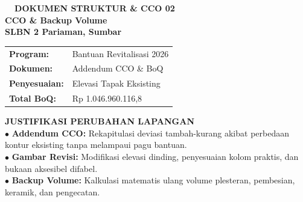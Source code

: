 \documentclass[10pt,a4paper,landscape]{article}
\begin{document}
\noindent
\begin{minipage}[t]{0.30\linewidth}
  \vspace{0pt}
  \begin{tcolorbox}[sharp corners, boxrule=0.8pt, colframe=pborder, colback=white, left=3mm, right=3mm, top=2.5mm, bottom=2.5mm, height=98mm]
    \colorbox{pred}{\fontsize{7pt}{8pt}\selectfont\bfseries\color{white}\ \ DOKUMEN STRUKTUR \& CCO 02\ \ }\\[1.5mm]
    {\fontsize{9.5pt}{11.5pt}\selectfont\bfseries\color{pnavy}CCO \& Backup Volume}\\[0.5mm]
    {\fontsize{7pt}{8.5pt}\selectfont\bfseries\color{pred}SLBN 2 Pariaman, Sumbar}\\[2mm]

    \begin{tcolorbox}[sharp corners, boxrule=0.5pt, colframe=pborder, colback=pbglight, left=2mm, right=2mm, top=1.5mm, bottom=1.5mm]
      \begin{tabularx}{\linewidth}{@{}p{22mm} X@{}}
        {\fontsize{6.8pt}{8pt}\selectfont\bfseries Program:} & {\fontsize{6.8pt}{8pt}\selectfont Bantuan Revitalisasi 2026} \\[0.8mm]
        {\fontsize{6.8pt}{8pt}\selectfont\bfseries Dokumen:} & {\fontsize{6.8pt}{8pt}\selectfont Addendum CCO \& BoQ} \\[0.8mm]
        {\fontsize{6.8pt}{8pt}\selectfont\bfseries Penyesuaian:} & {\fontsize{6.8pt}{8pt}\selectfont Elevasi Tapak Eksisting} \\[0.8mm]
        {\fontsize{6.8pt}{8pt}\selectfont\bfseries Total BoQ:} & {\fontsize{6.8pt}{8pt}\selectfont Rp 1.046.960.116,8}
      \end{tabularx}
    \end{tcolorbox}
    \vspace{1.5mm}

    {\fontsize{7.5pt}{9pt}\selectfont\bfseries\color{pnavy}JUSTIFIKASI PERUBAHAN LAPANGAN}\\[0.8mm]
    {\fontsize{6.5pt}{8.2pt}\selectfont\color{psteel}
    $\bullet$ \textbf{Addendum CCO:} Rekapitulasi deviasi tambah-kurang akibat perbedaan kontur eksisting tanpa melampaui pagu bantuan.\\
    $\bullet$ \textbf{Gambar Revisi:} Modifikasi elevasi dinding, penyesuaian kolom praktis, dan bukaan aksesibel difabel.\\
    $\bullet$ \textbf{Backup Volume:} Kalkulasi matematis ulang volume plesteran, pembesian, keramik, dan pengecatan.
    }
  \end{tcolorbox}
  \vspace{2mm}


\end{minipage}
\end{document}
